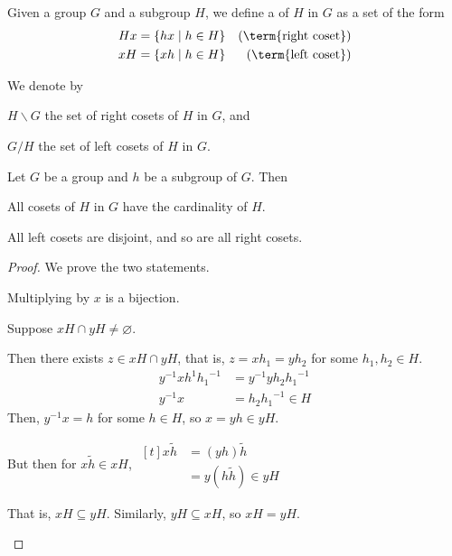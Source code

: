 \begin{definition}[Coset]\label{def:coset}
    Given a group $G$ and a subgroup $H$, we define a  of $H$ in $G$ as a set of the form 
    \begin{align*}
        Hx & = \{ hx \mid h \in H \} & (\text{\term{right coset}}) \\
        xH & = \{ xh \mid h \in H \} & (\text{\term{left coset}})
    \end{align*}

    We denote by 
    \begin{listu}
        \item $H \backslash G$ the set of right cosets of $H$ in $G$, and 
        \item $G / H$ the set of left cosets of $H$ in $G$.
    \end{listu}
\end{definition}

\begin{proposition}
    Let $G$ be a group and $h$ be a subgroup of $G$. Then 
    \begin{listo}
        \item All cosets of $H$ in $G$ have the cardinality of $H$.
        \item All left cosets are disjoint, and so are all right cosets.
    \end{listo}
\end{proposition}

\begin{proof}
    We prove the two statements. 

    \begin{listo}
        \item Multiplying by $x$ is a bijection.
        
        \item Suppose $xH \cap yH \neq \varnothing$. 
        
        Then there exists $z \in xH \cap yH$, that is, $z = xh_1 = yh_2$ for some $h_1, h_2 \in H$.
        \begin{align*}
            y^{-1} x h^1 {h_1}^{-1} & = y^{-1} y h_2 {h_1}^{-1} \\ 
            y^{-1} x                & = h_2 {h_1}^{-1} \in H
        \end{align*}
        Then, $y^{-1} x = h$ for some $h \in H$, so $x = yh \in yH$.

        But then for $x \tilde{h} \in xH$, $\begin{aligned}[t]
            x \tilde{h} & = (yh) \tilde{h} \\
                        & = y (h \tilde{h}) \in yH
        \end{aligned}$

        That is, $xH \subseteq yH$. Similarly, $yH \subseteq xH$, so $xH = yH$.
    \end{listo}
\end{proof}

